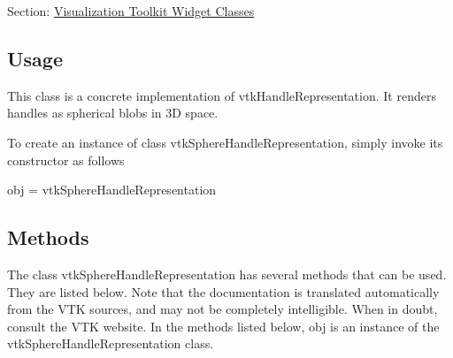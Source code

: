 Section\-: \hyperlink{sec_vtkwidgets}{Visualization Toolkit Widget Classes} \hypertarget{vtkwidgets_vtkxyplotwidget_Usage}{}\subsection{Usage}\label{vtkwidgets_vtkxyplotwidget_Usage}
This class is a concrete implementation of vtk\-Handle\-Representation. It renders handles as spherical blobs in 3\-D space.

To create an instance of class vtk\-Sphere\-Handle\-Representation, simply invoke its constructor as follows \begin{DoxyVerb}  obj = vtkSphereHandleRepresentation
\end{DoxyVerb}
 \hypertarget{vtkwidgets_vtkxyplotwidget_Methods}{}\subsection{Methods}\label{vtkwidgets_vtkxyplotwidget_Methods}
The class vtk\-Sphere\-Handle\-Representation has several methods that can be used. They are listed below. Note that the documentation is translated automatically from the V\-T\-K sources, and may not be completely intelligible. When in doubt, consult the V\-T\-K website. In the methods listed below, {\ttfamily obj} is an instance of the vtk\-Sphere\-Handle\-Representation class. 
